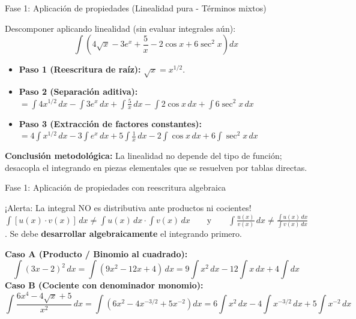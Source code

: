 \documentclass[aspectratio=169,11pt]{beamer}
\begin{document}
\begin{frame}{Fase 1: Aplicación de propiedades (Linealidad pura - Términos mixtos)}
\footnotesize
\begin{examplebox}[title=Ejemplo guiado 2: Funciones de distinta naturaleza, top=3pt,bottom=3pt]
\footnotesize
Descomponer aplicando linealidad (sin evaluar integrales aún):
\[
\int \left( 4\sqrt{x} - 3e^x + \frac{5}{x} - 2\cos x + 6\sec^2 x \right) dx
\]
\begin{itemize}[itemsep=3pt]
  \item \textbf{Paso 1 (Reescritura de raíz):} $\sqrt{x} = x^{1/2}$.
  \item \textbf{Paso 2 (Separación aditiva):}
  \\[2pt]
  $\displaystyle = \int 4x^{1/2}\,dx - \int 3e^x\,dx + \int \frac{5}{x}\,dx - \int 2\cos x\,dx + \int 6\sec^2 x\,dx$
  \item \textbf{Paso 3 (Extracción de factores constantes):}
  \\[2pt]
  $\displaystyle = 4\int x^{1/2}\,dx - 3\int e^x\,dx + 5\int \frac{1}{x}\,dx - 2\int \cos x\,dx + 6\int \sec^2 x\,dx$
\end{itemize}
\end{examplebox}
\vspace{0.04cm}
\begin{techbox}[top=2pt,bottom=2pt]
\scriptsize \textbf{Conclusión metodológica:} La linealidad no depende del tipo de función; desacopla el integrando en piezas elementales que se resuelven por tablas directas.
\end{techbox}
\end{frame}

\begin{frame}{Fase 1: Aplicación de propiedades con reescritura algebraica}
\footnotesize
\begin{alertblock}{¡Alerta: La integral NO es distributiva ante productos ni cocientes!}
\scriptsize
$\int [u(x)\cdot v(x)]\,dx \neq \int u(x)\,dx \cdot \int v(x)\,dx \qquad\text{y}\qquad \int \frac{u(x)}{v(x)}\,dx \neq \frac{\int u(x)\,dx}{\int v(x)\,dx}$.
Se debe \textbf{desarrollar algebraicamente} el integrando primero.
\end{alertblock}
\vspace{0.04cm}
\begin{examplebox}[title=Ejemplo guiado 3: Reescritura antes de linealidad, top=2pt,bottom=2pt]
\scriptsize
\textbf{Caso A (Producto / Binomio al cuadrado):}
\[
\int (3x - 2)^2\,dx = \int (9x^2 - 12x + 4)\,dx = 9\int x^2\,dx - 12\int x\,dx + 4\int dx
\]
\textbf{Caso B (Cociente con denominador monomio):}
\[
\int \frac{6x^4 - 4\sqrt{x} + 5}{x^2}\,dx = \int \left( 6x^2 - 4x^{-3/2} + 5x^{-2} \right) dx = 6\int x^2\,dx - 4\int x^{-3/2}\,dx + 5\int x^{-2}\,dx
\]
\end{examplebox}
\end{frame}
\end{document}
